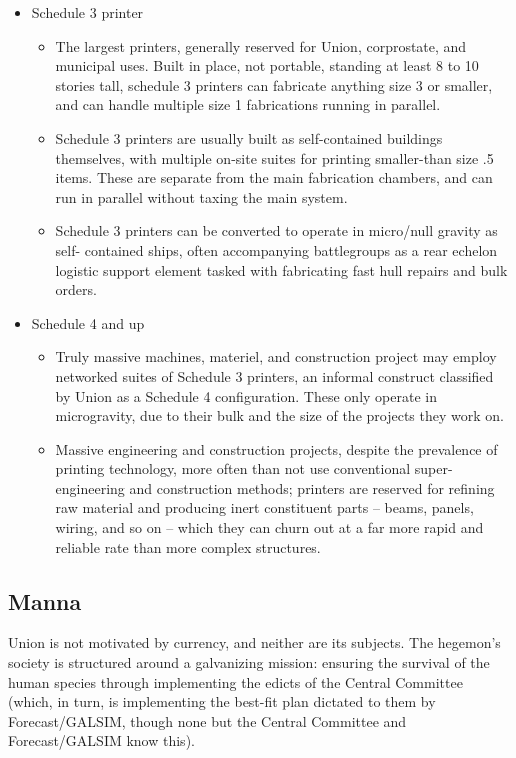 \begin{itemize}
\begin{itemize}
\end{itemize}
\item Schedule 3 printer
\begin{itemize}
\item The largest printers, generally reserved for Union, corprostate, and municipal
      uses. Built in place, not portable, standing at least 8 to 10 stories tall, schedule 3
      printers can fabricate anything size 3 or smaller, and can handle multiple size 1
      fabrications running in parallel.
\item Schedule 3 printers are usually built as self-contained buildings themselves, with
      multiple on-site suites for printing smaller-than size .5 items. These are separate
      from the main fabrication chambers, and can run in parallel without taxing the
      main system.
\item Schedule 3 printers can be converted to operate in micro/null gravity as self-
      contained ships, often accompanying battlegroups as a rear echelon logistic
      support element tasked with fabricating fast hull repairs and bulk orders.
\end{itemize}
\item Schedule 4 and up
\begin{itemize}
\item Truly massive machines, materiel, and construction project may employ
      networked suites of Schedule 3 printers, an informal construct classified by Union
      as a Schedule 4 configuration. These only operate in microgravity, due to their
      bulk and the size of the projects they work on.
\item Massive engineering and construction projects, despite the prevalence of printing
      technology, more often than not use conventional super-engineering and
      construction methods; printers are reserved for refining raw material and
      producing inert constituent parts -- beams, panels, wiring, and so on -- which they
      can churn out at a far more rapid and reliable rate than more complex structures.
\end{itemize}
\end{itemize}

\subsection{Manna}

Union is not motivated by currency, and neither are its subjects. The hegemon’s society is
structured around a galvanizing mission: ensuring the survival of the human species through
implementing the edicts of the Central Committee (which, in turn, is implementing the best-fit
plan dictated to them by Forecast/GALSIM, though none but the Central Committee and
Forecast/GALSIM know this).

